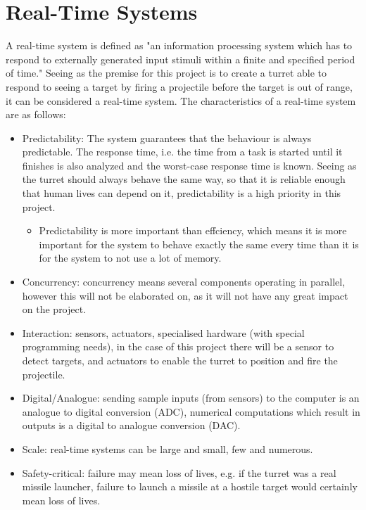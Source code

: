 \section{Real-Time Systems}

A real-time system is defined as "an information processing system which has to respond to externally generated input stimuli within a finite and specified period of time." \citep{realtime} Seeing as the premise for this project is to create a turret able to respond to seeing a target by firing a projectile before the target is out of range, it can be considered a real-time system. The characteristics of a real-time system are as follows:
\begin{itemize}
	\item Predictability: The system guarantees that the behaviour is always predictable. The response time, i.e. the time from a task is started until it finishes is also analyzed and the worst-case response time is known. Seeing as the turret should always behave the same way, so that it is reliable enough that human lives can depend on it, predictability is a high priority in this project.
		\begin{itemize}
			\item Predictability is more important than effciency, which means it is more important for the system to behave exactly the same every time than it is for the system to not use a lot of memory.
		\end{itemize}
	\item Concurrency: concurrency means several components operating in parallel, however this will not be elaborated on, as it will not have any great impact on the project. 
	\item Interaction: sensors, actuators, specialised hardware (with special programming needs), in the case of this project there will be a sensor to detect targets, and actuators to enable the turret to position and fire the projectile.
	\item Digital/Analogue: sending sample inputs (from sensors) to the computer is an analogue to digital conversion (ADC), numerical computations which result in outputs is a digital to analogue conversion (DAC).
	\item Scale: real-time systems can be large and small, few and numerous.
	\item Safety-critical: failure may mean loss of lives, e.g. if the turret was a real missile launcher, failure to launch a missile at a hostile target would certainly mean loss of lives.
\end{itemize}\citep{realtime}

